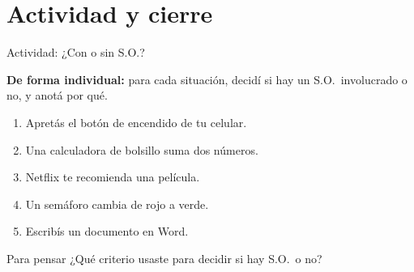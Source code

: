 \documentclass[xcolor=svgnames]{beamer}
\begin{document}
\section{Actividad y cierre}

\begin{frame}{Actividad: ¿Con o sin S.O.?}

  \textbf{De forma individual:} para cada situación, decidí si hay un S.O.\ involucrado o no, y anotá por qué.

  \vspace{0.3cm}

  \begin{enumerate}
    \item Apretás el botón de encendido de tu celular.
    \item Una calculadora de bolsillo suma dos números.
    \item Netflix te recomienda una película.
    \item Un semáforo cambia de rojo a verde.
    \item Escribís un documento en Word.
  \end{enumerate}

  \vspace{0.3cm}
  \begin{alertblock}{Para pensar}
    ¿Qué criterio usaste para decidir si hay S.O.\ o no?
  \end{alertblock}

\end{frame}
\end{document}
